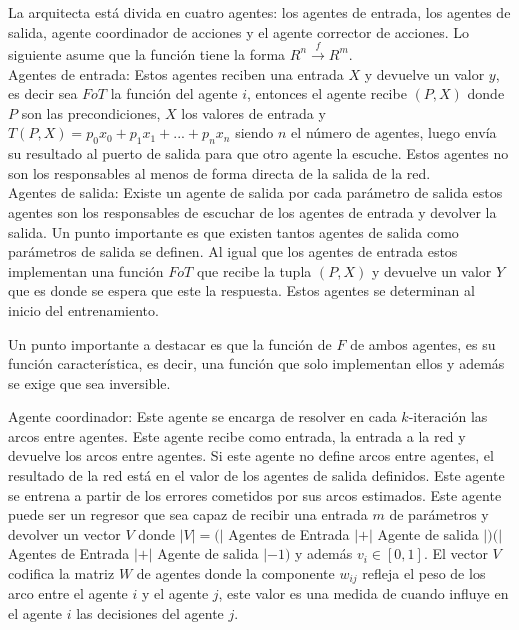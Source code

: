         La arquitecta está divida en cuatro agentes: los agentes de entrada, los agentes de salida, agente coordinador de acciones y el agente corrector de acciones. Lo siguiente asume que la función tiene la forma $R^n \xrightarrow{f} R^m$. \\

        Agentes de entrada: Estos agentes reciben una entrada $X$ y devuelve un valor $y$, es decir sea $FoT$ la función del agente $i$, entonces el agente recibe $(P,X)$ donde $P$ son las precondiciones, $X$ los valores de entrada y
        $T(P,X)=p_0x_0 + p_1x_1 +...+p_nx_n$ siendo $n$ el número de agentes, luego envía su resultado al puerto de salida para que otro agente la escuche. Estos agentes no son los responsables al menos de forma directa de la salida de la red.\\

        Agentes de salida: Existe un agente de salida por cada parámetro de salida estos agentes son los responsables de escuchar de los agentes de entrada y devolver la salida.
        Un punto importante es que existen tantos agentes de salida como parámetros de salida se definen. Al igual que los agentes de entrada estos implementan una función $FoT$ 
        que recibe la tupla $(P,X)$ y devuelve un valor $Y$ que es donde se espera que este la respuesta. Estos agentes se determinan al inicio del entrenamiento.

        Un punto importante a destacar es que la función de $F$ de ambos agentes, es su función característica, es decir, una función que solo implementan ellos y además se exige que sea inversible.

        Agente coordinador: Este agente se encarga de resolver en cada $k$-iteración las arcos entre agentes. Este agente recibe como entrada, la entrada a la red 
        y devuelve los arcos entre agentes. Si este agente no define arcos entre agentes, el resultado de la red está en el valor de los agentes de salida definidos. Este agente se entrena 
        a partir de los errores cometidos por sus arcos estimados. Este agente puede ser un regresor que sea capaz de recibir una entrada $m$ de parámetros y devolver
         un vector $V$ donde $|V|=(|$ Agentes de Entrada $| + |$ Agente de salida $|)(|$ Agentes de Entrada $| + |$ Agente de salida $| - 1)$ y además $v_i \in [0,1]$.
          El vector $V$ codifica la matriz $W$ de agentes donde la componente $w_{ij}$ refleja el peso de los arco entre el agente $i$ y el agente $j$, este valor es una 
          medida de cuando influye en el agente $i$ las decisiones del agente $j$.\\


